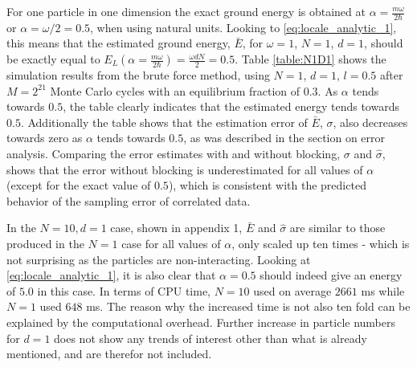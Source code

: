 \documentclass[%
oneside,                 %
final,                   %
10pt]{article}
\begin{document}
For one particle in one dimension the exact ground energy is obtained at $\alpha=\frac{m\omega}{2\hbar}$ or $\alpha=\omega/2=0.5$, when using natural units. Looking to \eqref{eq:locale_analytic_1}, this means that the estimated ground energy, $\bar E$, for $\omega=1$, $N=1$, $d=1$, should be exactly equal to $E_L(\alpha=\frac{m\omega}{2\hbar})=\frac{\omega d N}{2} = 0.5$.  Table \ref{table:N1D1} shows the simulation results from the brute force method, using $N=1$, $d=1$, $l=0.5$ after $M=2^{21}$ Monte Carlo cycles with an equilibrium fraction of $0.3$. As $\alpha$ tends towards $0.5$, the table clearly indicates that the estimated energy tends towards $0.5$. Additionally the table shows that the estimation error of $\bar E$, $\sigma$, also decreases towards zero as $\alpha$ tends towards $0.5$, as was described in the section on error analysis. Comparing the error estimates with and without blocking, $\sigma$ and $\hat \sigma $, shows that the error without blocking is underestimated for all values of $\alpha$ (except for the exact value of $0.5$), which is consistent with the predicted behavior of the sampling error of correlated data.	

In the $N=10, d=1$ case, shown in appendix 1, $\bar E$ and $\hat \sigma$ are similar to those produced in the $N=1$ case for all values of $\alpha$, only scaled up ten times - which is not surprising as the particles are non-interacting. Looking at \eqref{eq:locale_analytic_1}, it is also clear that $\alpha=0.5$ should indeed give an energy of $5.0$ in this case. In terms of CPU time, $N=10$ used on average $2661$ ms while $N=1$ used $648$ ms. The reason why the increased time is not also ten fold can be explained by the computational overhead. Further increase in particle numbers for $d=1$ does not show any trends of interest other than what is already mentioned, and are therefor not included. 
\end{document}
